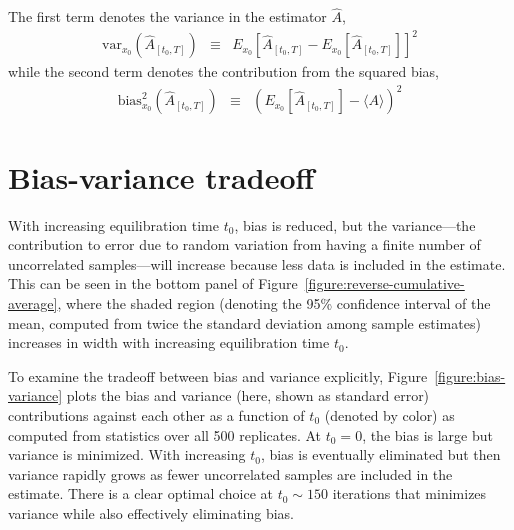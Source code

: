 \documentclass[aps,pre,twocolumn,nofootinbib,superscriptaddress,linenumbers,11point]{revtex4-1}
\newcommand{\expect}[1]{\langle #1 \rangle}                %
\begin{document}
The first term denotes the variance in the estimator $\hat{A}$,
\begin{eqnarray}
\mathrm{var}_{x_0} (\hat{A}_{[t_0,T]}) &\equiv& E_{x_0} \left[ \hat{A}_{[t_0,T]} - E_{x_0}[\hat{A}_{[t_0,T]}] \right]^2 \label{equation:variance}
\end{eqnarray}
while the second term denotes the contribution from the squared bias,
\begin{eqnarray}
\mathrm{bias}^2_{x_0} (\hat{A}_{[t_0,T]}) &\equiv& \left( E_{x_0}[\hat{A}_{[t_0,T]}] - \expect{A} \right)^2 \label{equation:variance}
\end{eqnarray}


\section*{Bias-variance tradeoff}

With increasing equilibration time $t_0$, bias is reduced, but the variance---the contribution to error due to random variation from having a finite number of uncorrelated samples---will increase because less data is included in the estimate.
This can be seen in the bottom panel of Figure~\ref{figure:reverse-cumulative-average}, where the shaded region (denoting the 95\% confidence interval of the mean, computed from twice the standard deviation among sample estimates) increases in width with increasing equilibration time $t_0$.

To examine the tradeoff between bias and variance explicitly, Figure~\ref{figure:bias-variance} plots the bias and variance (here, shown as standard error) contributions against each other as a function of $t_0$ (denoted by color) as computed from statistics over all 500 replicates.
At $t_0 = 0$, the bias is large but variance is minimized.
With increasing $t_0$, bias is eventually eliminated but then variance rapidly grows as fewer uncorrelated samples are included in the estimate.
There is a clear optimal choice at $t_0 \sim 150$ iterations that minimizes variance while also effectively eliminating bias.

\end{document}
